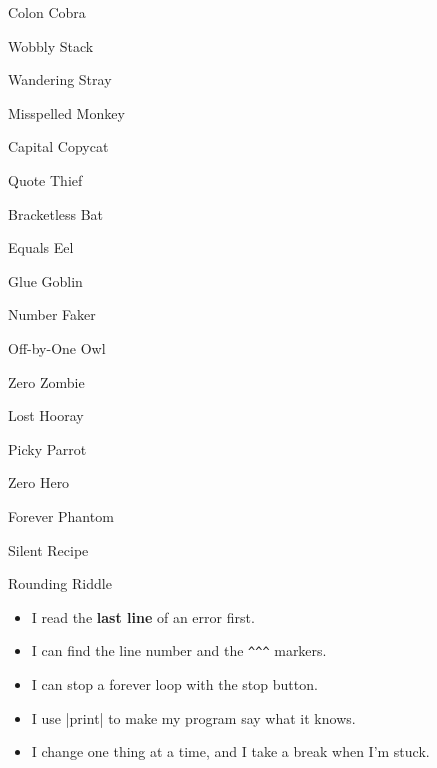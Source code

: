 \begin{tcbraster}[raster columns=3, raster column skip=8pt, raster equal height]
\begin{tcolorbox}[colback=errbg, colframe=errframe, boxrule=0.5pt, arc=4pt, fontupper=\small]
\tick Colon Cobra\par \tick Wobbly Stack\par \tick Wandering Stray\par \tick Misspelled Monkey\par \tick Capital Copycat\par \tick Quote Thief
\end{tcolorbox}
\begin{tcolorbox}[colback=errbg, colframe=errframe, boxrule=0.5pt, arc=4pt, fontupper=\small]
\tick Bracketless Bat\par \tick Equals Eel\par \tick Glue Goblin\par \tick Number Faker\par \tick Off-by-One Owl\par \tick Zero Zombie
\end{tcolorbox}
\begin{tcolorbox}[colback=errbg, colframe=errframe, boxrule=0.5pt, arc=4pt, fontupper=\small]
\tick Lost Hooray\par \tick Picky Parrot\par \tick Zero Hero\par \tick Forever Phantom\par \tick Silent Recipe\par \tick Rounding Riddle
\end{tcolorbox}
\end{tcbraster}

\begin{itemize}[label={}, leftmargin=0pt]
  \item \tick I read the \textbf{last line} of an error first.
  \item \tick I can find the line number and the \texttt{\textasciicircum\textasciicircum\textasciicircum} markers.
  \item \tick I can stop a forever loop with the stop button.
  \item \tick I use \py|print| to make my program say what it knows.
  \item \tick I change one thing at a time, and I take a break when I'm stuck.
\end{itemize}
